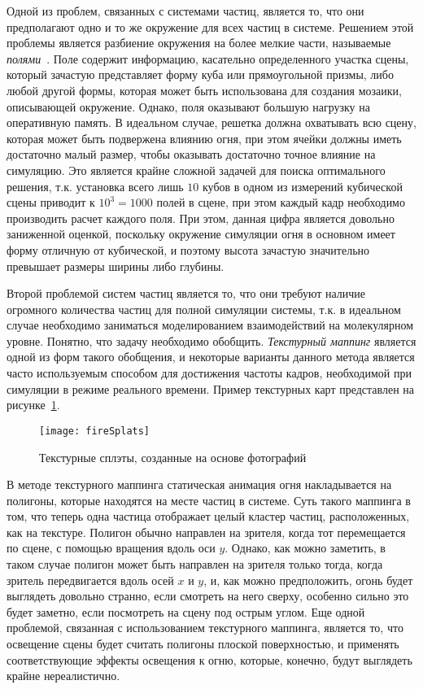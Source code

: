 Одной из проблем, связанных с системами частиц, является то, что они
предполагают одно и то же окружение для всех частиц в системе. Решением этой
проблемы является разбиение окружения на более мелкие части, называемые
\emph{полями}~\cite{nielsen}. Поле содержит информацию, касательно определенного
участка сцены, который зачастую представляет форму куба или прямоугольной
призмы, либо любой другой формы, которая может быть использована для создания
мозаики, описывающей окружение. Однако, поля оказывают большую нагрузку на
оперативную память. В идеальном случае, решетка должна охватывать всю сцену,
которая может быть подвержена влиянию огня, при этом ячейки должны иметь
достаточно малый размер, чтобы оказывать достаточно точное влияние на симуляцию.
Это является крайне сложной задачей для поиска оптимального решения, т\@.к\@.
установка всего лишь $10$ кубов в одном из измерений кубической сцены приводит к
$10^3 = 1000$ полей в сцене, при этом каждый кадр необходимо производить расчет
каждого поля. При этом, данная цифра является довольно заниженной оценкой,
поскольку окружение симуляции огня в основном имеет форму отличную от
кубической, и поэтому высота зачастую значительно превышает размеры ширины либо
глубины.

Второй проблемой систем частиц является то, что они требуют наличие огромного
количества частиц для полной симуляции системы, т\@.к\@. в идеальном случае
необходимо заниматься моделированием взаимодействий на молекулярном уровне.
Понятно, что задачу необходимо обобщить. \emph{Текстурный маппинг} является
одной из форм такого обобщения, и некоторые варианты данного метода является
часто используемым способом для достижения частоты кадров, необходимой при
симуляции в режиме реального времени. Пример текстурных карт представлен на
рисунке~\ref{fig:fireSplats}.
\begin{figure}[htb]
	\centering
    \texttt{[image: fireSplats]}
    \caption{Текстурные сплэты, созданные на основе
    фотографий~\cite{FireSplats}}%
    \label{fig:fireSplats}
\end{figure}
В методе текстурного маппинга статическая анимация огня накладывается на
полигоны, которые находятся на месте частиц в системе. Суть такого маппинга в
том, что теперь одна частица отображает целый кластер частиц, расположенных, как
на текстуре. Полигон обычно направлен на зрителя, когда тот перемещается по
сцене, с помощью вращения вдоль оси $y$. Однако, как можно заметить, в таком
случае полигон может быть направлен на зрителя только тогда, когда зритель
передвигается вдоль осей $x$ и $y$, и, как можно предположить, огонь будет
выглядеть довольно странно, если смотреть на него сверху, особенно сильно это
будет заметно, если посмотреть на сцену под острым углом. Еще одной проблемой,
связанная с использованием текстурного маппинга, является то, что освещение
сцены будет считать полигоны плоской поверхностью, и применять соответствующие
эффекты освещения к огню, которые, конечно, будут выглядеть крайне
нереалистично.

